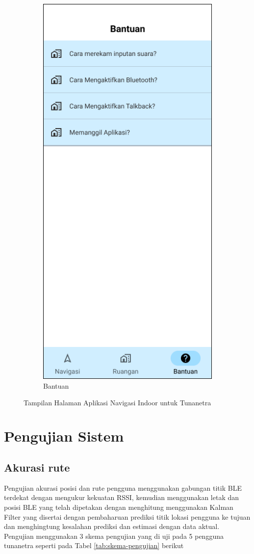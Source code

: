 \begin{enumerate}
\begin{figure} [H]
\begin{subfigure}{.5\textwidth}
 		\includegraphics[width=.5\linewidth]{gambar/bab4/bantuan} 
 		\caption{Bantuan}
	\end{subfigure}
		\vspace{0.5cm}
		\caption{Tampilan Halaman Aplikasi Navigasi Indoor untuk Tunanetra}
	\label{aplikasimappingbagian1}
	\end{figure}

\end{enumerate}

\newpage
\section{Pengujian Sistem}
\subsection{Akurasi rute}
\par Pengujian akurasi posisi dan rute pengguna menggunakan gabungan titik BLE terdekat dengan mengukur kekuatan RSSI, kemudian menggunakan letak dan posisi BLE yang telah dipetakan dengan menghitung menggunakan Kalman Filter yang disertai dengan pembaharuan prediksi titik lokasi pengguna ke tujuan dan menghingtung kesalahan prediksi dan estimasi dengan data aktual.
Pengujian menggunakan 3 skema pengujian yang di uji pada 5 pengguna tunanetra seperti pada Tabel \ref{tab:skema-pengujian} berikut





